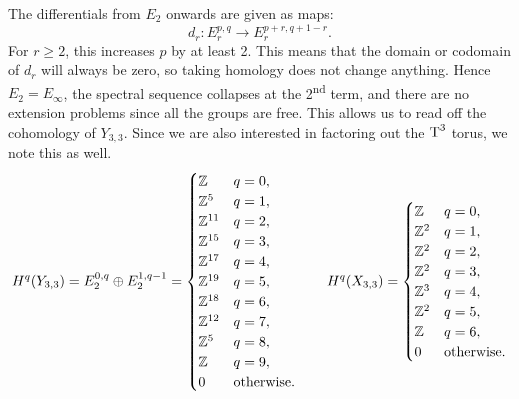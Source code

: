 The differentials from $E_2$ onwards are given as maps:
\[ d_r : E_r^{p,q} \to E_r^{p+r,q+1-r}. \]
For $r\geq 2$, this increases $p$ by at least 2. This means that
the domain or codomain of $d_r$ will always be zero, so taking
homology does not change anything. Hence $E_2 = E_\infty$, the
spectral sequence collapses at the 2\textsuperscript{nd} term, and
there are no extension problems since all the groups are free. This
allows us to read off the cohomology of $Y_{3,3}$. Since
we are also interested in factoring out the $\operatorname{T}^3$ torus, we note this
as well.
\[ H^q(Y_{3,3}) = E_2^{0,q} \oplus E_2^{1,q-1} = 
\begin{cases}
  \mathbb{Z} & q = 0, \\
  \mathbb{Z}^{5} & q = 1,\\
  \mathbb{Z}^{11} & q = 2,\\
  \mathbb{Z}^{15} & q = 3,\\
  \mathbb{Z}^{17} & q = 4,\\
  \mathbb{Z}^{19} & q = 5,\\
  \mathbb{Z}^{18} & q = 6,\\
  \mathbb{Z}^{12} & q = 7,\\
  \mathbb{Z}^{5} & q = 8,\\
  \mathbb{Z} & q = 9,\\
  0 & \text{otherwise}.
\end{cases} \qquad
H^q(X_{3,3}) =
\begin{cases}
  \mathbb{Z} & q = 0, \\
  \mathbb{Z}^{2} & q=1, \\
  \mathbb{Z}^{2} & q=2, \\
  \mathbb{Z}^{2} & q=3, \\
  \mathbb{Z}^{3} & q=4, \\
  \mathbb{Z}^{2} & q=5, \\
  \mathbb{Z} & q=6, \\
  0 & \text{otherwise}.
\end{cases}
\]

